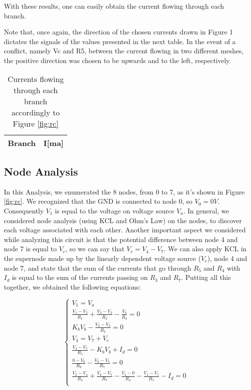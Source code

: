 With these results, one can easily obtain the current flowing through each branch.

Note that, once again, the direction of the chosen currents drawn in Figure 1 dictates the signals of the values presented in the next table. In the event of a conflict, namely Vc and R5, between the current flowing in two different meshes, the positive direction was chosen to be upwards and to the left, respectively.

\begin{table}[h]
  \centering
  \begin{tabular}{|l|r|}
    \hline    
    {\bf Branch} & {\bf I[ma]} \\ \hline
    
 \end{tabular}
 \caption{Currents flowing through each branch accordingly to Figure \ref{fig:rc}}
  \label{tab:op}
  \label{tab:op}
\end{table}


\subsection{Node Analysis}
In this Analysis, we enumerated the 8 nodes, from 0 to 7, as it's shown in Figure \ref{fig:rc}. We recognized that the GND is connected to node 0, so $V_{0}=0V$. Consequently $V_1$ is equal to the voltage on voltage source $V_a$. In general, we considered node analysis (using KCL and Ohm's Law) on the nodes, to discover each voltage associated with each other. Another important aspect we considered while analyzing this circuit is that the potential difference between node 4 and node 7 is equal to $V_c$, so we can say that $V_c=V_4-V_7$. We can also apply KCL in the supernode made up by the linearly dependent voltage source ($V_c$), node 4 and node 7, and state that the sum of the currents that go through $R_5$ and $R_4$ with $I_d$ is equal to the sum of the currents passing on $R_3$ and $R_7$.
Putting all this together, we obtained the following equations:

\begin{equation}
\begin{cases}
V_1=V_a\\
\frac{V_1-V_2}{R_1} + \frac{V_3-V_2}{R_2} - \frac{V_b}{R_3}=0\\
K_bV_b - \frac{V_3-V_2}{R_2}=0\\
V_4= V_7+V_c\\

\frac{V_4-V_5}{R_5} - K_bV_b + I_d=0\\

\frac{0-V_6}{R_6} - \frac{V_6-V_7}{R_7} = 0\\
\frac{V_2-V_4}{R_3} + \frac{V_6-V_7}{R_7} - \frac{V_4-0}{R_4}-\frac{V_4-V_5}{R_5}-I_d=0\\
\end{cases}
\end{equation}

